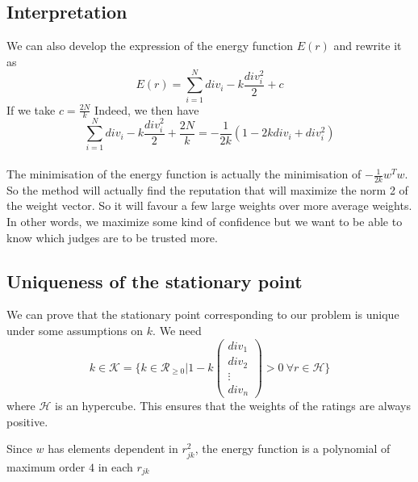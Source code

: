 \documentclass[12pt,a4paper]{article}
\begin{document}
\subsection{Interpretation}
We can also develop the expression of the energy function $E(r)$ and rewrite it as
$$ E(r) = \sum_{i=1}^N div_i - k \frac{div_i^2}{2} + c$$
If we take $c = \frac{2N}{k}$
Indeed, we then have $$ \sum_{i=1}^N div_i - k \frac{div_i^2}{2} + \frac{2N}{k}= -\frac{1}{2k}(1 - 2kdiv_i + div_i^2)$$
\\
The minimisation of the energy function is actually the minimisation of $  -\frac{1}{2k} w^Tw $.
So the method will actually find the reputation that will maximize the norm 2 of the weight vector. So it will favour a few large weights over more average weights. In other words, we maximize some kind of confidence but we want to be able to know which judges are to be trusted more.


\subsection{Uniqueness of the stationary point}

We can prove that the stationary point corresponding to our problem is unique under some assumptions on $k$.
We need $$k\in \mathcal{K} = \{k\in \mathcal{R}_{\geq 0} | 1 - k \begin{pmatrix} div_1 \\ div_2 \\ \vdots \\ div_n \end{pmatrix} >0 \: \forall r \in \mathcal{H} \}$$
where $\mathcal{H}$ is an hypercube. This ensures that the weights of the ratings are always positive. 

 Since $w$ has elements dependent in $r_{jk}^2$, the energy function is a polynomial of maximum order $4$ in each $r_{jk}$
\end{document}

